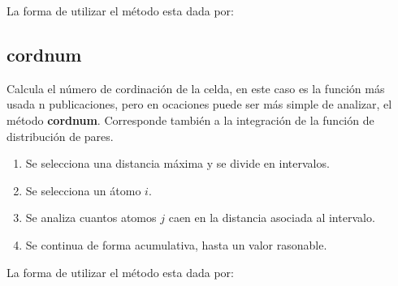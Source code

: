 La forma de utilizar el m\'etodo esta dada por:


\subsection{cordnum}
Calcula el n\'umero de cordinaci\'on de la celda, en este caso es la funci\'on
m\'as usada n publicaciones, pero en ocaciones puede ser m\'as simple de
analizar, el m\'etodo \textbf{cordnum}. Corresponde tambi\'en a la integraci\'on
de la funci\'on de distribuci\'on de pares.
\begin{enumerate}
 \item Se selecciona una distancia m\'axima y se divide en intervalos.
 \item Se selecciona un \'atomo $i$.
 \item Se analiza cuantos atomos $j$ caen en la distancia asociada al intervalo.
 \item Se continua de forma acumulativa, hasta un valor rasonable.
\end{enumerate}

La forma de utilizar el m\'etodo esta dada por:


